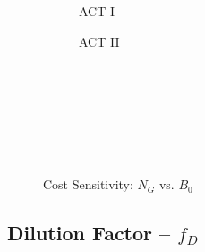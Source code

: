 \begin{figure*}[h!]
\begin{subfigure}[t]{0.45\textwidth}
\begin{adjustbox}{width=\textwidth}
      \Large
      
    \end{adjustbox}
        \caption{ACT I}
    \end{subfigure}
    \hfill
    \begin{subfigure}[t]{0.45\textwidth}
        \centering
    \begin{adjustbox}{width=\textwidth}
      \Large
      
    \end{adjustbox}
        \caption{ACT II}
    \end{subfigure}
    \hfill \hfill ~\\ ~\\ ~\\ ~\\
  \caption[]{Cost Sensitivity: $N_G$ vs. $B_0$} ~\\
\end{figure*}


\clearpage

\newpage

\subsection*{ Dilution Factor -- $f_D$ }
  \label{subsection:sensitivity_f_D}

